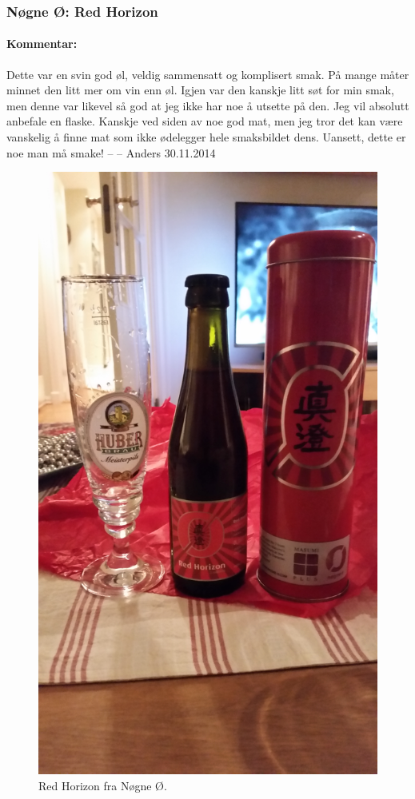 \documentclass[12pt,a4paper,oneside,norsk]{article}
\begin{document}
\subsubsection{Nøgne Ø: Red Horizon }
\paragraph{Kommentar:} Dette var en svin god øl, veldig sammensatt og komplisert smak. På mange måter minnet den litt mer om vin enn øl. Igjen var den kanskje litt søt for min smak, men denne var likevel så god at jeg ikke har noe å utsette på den. Jeg vil absolutt anbefale en flaske. Kanskje ved siden av noe god mat, men jeg tror det kan være vanskelig å finne mat som ikke ødelegger hele smaksbildet dens. Uansett, dette er noe man må smake!
\newline
-- -- Anders 30.11.2014

\begin{figure} [H] 
\centering
\includegraphics[scale=0.04, angle=-90]{Bilder/Ol/redHorizon.jpg}
\caption{Red Horizon fra Nøgne Ø.}
\end{figure}
\end{document}
